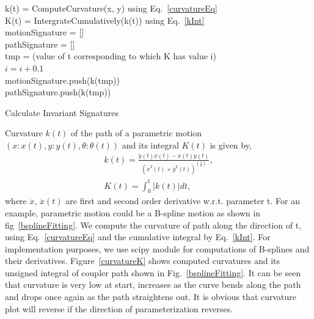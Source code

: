 \documentclass[twocolumn,10pt]{asme2e}
\begin{document}
\begin{algorithm}
    k(t) = ComputeCurvature(x, y) using Eq.~\ref{curvatureEq} \\
    K(t) = IntergrateCumulatively(k(t)) using Eq.~\ref{kInt} \\
    motionSignature = [] \\
    pathSignature = [] \\
    {
      tmp = (value of t corresponding to which K has value i) \\
      $i = i + 0.1$ \\
      motionSignature.push(k(tmp)) \\
      pathSignature.push(k(tmp))
    }
    \caption{Calculate Invariant Signatures}
    \label{alg_signature}
\end{algorithm}

Curvature $k(t)$ of the path of a parametric motion $(x:x(t), y:y(t), \theta:\theta(t))$ and its integral $K(t)$ is given by,
\begin{eqnarray}
  k(t) = \frac{\ddot{y}(t)\dot{x}(t) - \ddot{x}(t)\dot{y}(t)}{{(\dot{x}^2(t) + \dot{y}^2(t))}^{(\frac 32)}}, \label{curvatureEq}\\
  K(t) = \int^{t}_0 |k(t)|dt \label{kInt},
\end{eqnarray}
where $\dot{x}$, $\ddot{x}(t)$ are first and second order derivative w.r.t. parameter t.
For an example, parametric motion could be a B-spline motion as shown in fig~\ref{bsplineFitting}.
We compute the curvature of path along the direction of t, using Eq.~\ref{curvatureEq} and the cumulative integral by Eq.~\ref{kInt}.
For implementation purposes, we use scipy\cite{scipy} module for computations of B-splines and their derivatives.
Figure~\ref{curvatureK} shows computed curvatures and its unsigned integral of coupler path shown in Fig.~\ref{bsplineFitting}.
It can be seen that curvature is very low at start, increases as the curve bends along the path and drops once again as the path straightens out.
It is obvious that curvature plot will reverse if the direction of parameterization reverses.
\end{document}
